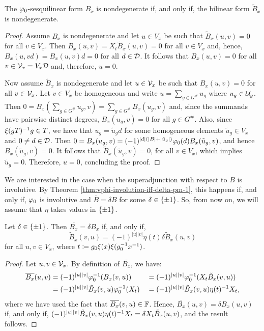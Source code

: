 \begin{lemma}\label{lemma:B_x-nondeg}
    The $\varphi_0$-sesquilinear form $B_x$ is nondegenerate if, and only if, the bilinear form $\tilde{B}_x$ is nondegenerate.
\end{lemma}

\begin{proof}
    Assume $B_x$ is nondegenerate and let $u \in V_x$ be such that $\tilde{B}_x(u,v) = 0$ for all $v \in V_x$. 
    Then $B_x(u, v) = X_{t} \tilde{B}_x(u,v) = 0$ for all $v \in V_x$ and, hence, $B_x(u, vd) = B_x(u, v)d = 0$ for all $d \in \mathcal{D}$. 
    It follows that $B_x(u,v) = 0$ for all $v\in \mathcal V_x = V_x \mathcal{D}$ and, therefore, $u = 0$.
    
    Now assume $\tilde{B}_x$ is nondegenerate and let $u \in \mathcal V_x$ be such that $B_x (u,v) = 0$ for all $v \in \mathcal V_x$.
    Let $v\in V_x$ be homogeneous and write $u = \sum_{g\in G^\#} u_g$ where $u_g \in \mathcal U_g$. 
    Then $0 = B_x(\sum_{g\in G^\#} u_g, v) = \sum_{g\in G^\#} B_x(u_g, v)$ and, since the summands have pairwise distinct degrees, $B_x(u_g, v) = 0$ for all $g\in G^\#$. 
    Also, since $\xi(gT)^{-1} g \in T$, we have that $u_g = \tilde u_g d$ for some homogeneous elements $\tilde u_g \in V_x$ and $0 \neq d \in \mathcal{D}$. 
    Then $0 = B_x(u_g, v) = (-1)^{|d|(|B| + |\tilde u_g|)} \varphi_0(d) B_x(\tilde u_g, v)$, and hence $B_x(\tilde u_g, v) = 0$. 
    It follows that $\tilde{B}_x(\tilde u_g, v) = 0$, for all $v\in V_x$, which implies $\tilde u_g = 0$. 
    Therefore, $u = 0$, concluding the proof.
\end{proof}

We are interested in the case when the superadjunction with respect to $B$ is involutive. 
By Theorem \ref{thm:vphi-involution-iff-delta-pm-1}, this happens if, and only if, $\varphi_0$ is involutive and $\overline B = \delta B$ for some $\delta \in \{ \pm 1 \}$. 
So, from now on, we will assume that $\eta$ takes values in $\{ \pm 1 \}$. 

\begin{lemma}\label{lemma:B_x-delta}
    Let $\delta \in \{ \pm 1 \}$. 
    Then $\overline{B_x} = \delta B_x$ if, and only if, 
    \[
        \tilde{B}_x (v, u) = (-1)^{|u| |v|} \eta(t) \delta \tilde{B}_x (u, v)
    \]
    for all $u, v \in V_x$, where $t \coloneqq g_0 \xi(x) \xi(g_0^{-1} x^{-1})$.
\end{lemma}

\begin{proof}
    Let $u,v \in \mathcal V_x$. 
    By definition of $\overline{B_x}$, we have:
    \begin{alignat*}{3}
        \overline{B_x} (u, v) &= (-1)^{|u||v|} \varphi_0^{-1}( B_x(v, u) )
        &&= (-1)^{|u||v|} \varphi_0^{-1}( X_t \tilde{B}_x(v, u) )\\
        &= (-1)^{|u||v|} \tilde{B}_x(v, u) \varphi_0^{-1}(X_t)
        &&= (-1)^{|u||v|} \tilde{B}_x(v, u) \eta(t)^{-1} X_t,
    \end{alignat*}
    where we have used the fact that $\overline{B_x} (v, u) \in \mathbb{F}$.
    Hence, $\overline{B_x} (u, v) = \delta {B_x} (u, v)$ if, and only if,
    $(-1)^{|u||v|} \tilde{B}_x(v, u) \eta(t)^{-1} X_t = \delta X_t \tilde{B}_x(u, v)$, and the result follows.
\end{proof}

